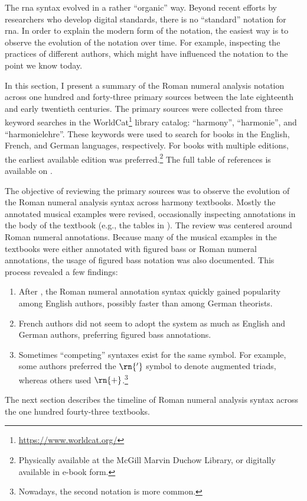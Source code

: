 

The \gls{rna} syntax evolved in a rather ``organic'' way.
Beyond recent efforts by researchers who develop digital
standards, there is no ``standard'' notation for \gls{rna}.
In order to explain the modern form of the notation, the
easiest way is to observe the evolution of the notation over
time. For example, inspecting the practices of different
authors, which might have influenced the notation to the
point we know today.

In this section, I present a summary of the Roman numeral
analysis notation across one hundred and forty-three primary
sources between the late eighteenth and early twentieth
centuries. The primary sources were collected from three
keyword searches in the
WorldCat\footnote{\href{https://www.worldcat.org/}{https://www.worldcat.org/}}
library catalog: ``harmony'', ``harmonie'', and
``harmonielehre''. These keywords were used to search for
books in the English, French, and German languages,
respectively. For books with multiple editions, the earliest
available edition was preferred.\footnote{Physically
available at the McGill Marvin Duchow Library, or digitally
available in e-book form.} The full table of references is
available on .



The objective of reviewing the primary sources was to
observe the evolution of the Roman numeral analysis syntax
across harmony textbooks. Mostly the annotated musical
examples were revised, occasionally inspecting annotations
in the body of the textbook (e.g., the tables in
\textcite{kirnberger1774kunst}). The review was centered
around Roman numeral annotations. Because many of the
musical examples in the textbooks were either annotated with
figured bass or Roman numeral annotations, the usage of
figured bass notation was also documented. This process
revealed a few findings:

\begin{enumerate}
    \item After \textcite{weber1817versuch}, the Roman
    numeral annotation syntax quickly gained popularity
    among English authors, possibly faster than among German
    theorists.
    \item French authors did not seem to adopt the system as
    much as English and German authors, preferring figured
    bass annotations.
    \item Sometimes ``competing'' syntaxes exist for the
    same symbol. For example, some authors preferred the
    $\rn{'}$ symbol to denote augmented triads, whereas
    others used $\rn{+}$.\footnote{Nowadays, the second
    notation is more common.}
\end{enumerate}

The next section describes the timeline of Roman numeral
analysis syntax across the one hundred fourty-three
textbooks.
